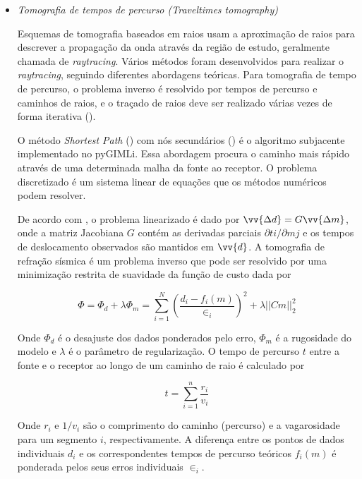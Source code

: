 \documentclass[a4paper, 12 pt]{article} %
\begin{document}
\begin{itemize}
	\item \textit{Tomografia de tempos de percurso (Traveltimes tomography)}
	
	\hspace{0.5cm} Esquemas de tomografia baseados em raios usam a aproximação de raios para descrever a propagação da onda através da região de estudo, geralmente chamada de \textit{raytracing}. Vários métodos foram desenvolvidos para realizar o \textit{raytracing}, seguindo diferentes abordagens teóricas. Para tomografia de tempo de percurso, o problema inverso é resolvido por tempos de percurso e caminhos de raios, e o traçado de raios deve ser realizado várias vezes de forma iterativa (\citealp{giroux2013task}).
	
	\hspace{0.5cm} O método \textit{Shortest Path} (\citealp{moser1991shortest}) com nós secundários (\citealp{giroux2013task}) é o algoritmo subjacente implementado no pyGIMLi. Essa abordagem procura o caminho mais rápido através de uma determinada malha da fonte ao receptor. O problema discretizado é um sistema linear de equações que os métodos numéricos podem resolver.
	
	\hspace{0.5cm} De acordo com \cite{ronczka2017electric}, o problema linearizado é dado por $\vv {\Delta d} = G \vv {\Delta m}$, onde a matriz Jacobiana $G$ contém as derivadas parciais ${\partial ti}/{\partial mj}$ e os tempos de deslocamento observados são mantidos em $\vv{d}$. A tomografia de refração sísmica é um problema inverso que pode ser resolvido por uma minimização restrita de suavidade da função de custo dada por
	
	\begin{equation}\label{eq:traveltimes}
	\Phi = \Phi_{d} + \lambda \Phi_{m} = \sum\limits_{i=1}^{N} \left(\frac{d_{i} - f_{i}(m)}{\in _{i}}\right)^{2} + \lambda ||Cm||_{2}^{2}
	\end{equation}
	
	Onde $\Phi_{d} $ é o desajuste dos dados ponderados pelo erro, $\Phi_{m}$ é a rugosidade do modelo e $\lambda$ é o parâmetro de regularização. O tempo de percurso $t$ entre a fonte e o receptor ao longo de um caminho de raio é calculado por
	
	\begin{equation}\label{eq:raio}
	t = \sum\limits_{i=1}^{n} \frac{r_{i}}{v_{i}}
	\end{equation}
	
	Onde $r_{i}$ e ${1}/{v_{i}}$ são o comprimento do caminho (percurso) e a vagarosidade para um segmento $i$, respectivamente. A diferença entre os pontos de dados individuais $d_{i} $ e os correspondentes tempos de percurso teóricos $f_{i}(m)$ é ponderada pelos seus erros individuais $\in _{i}$.
	

\end{itemize}
\end{document}
